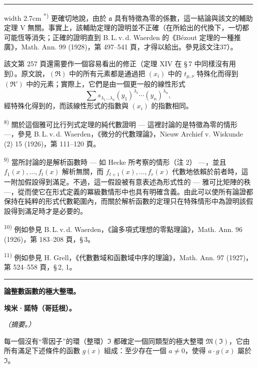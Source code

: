 \documentclass[11pt]{article}
\begin{document}
{\medskip
\hrule width 2.7cm
\smallskip
\noindent\textsuperscript{*)} 更確切地說，由於 $\mathfrak{a}$ 具有特徵為零的係數，這一結論與該文的輔助定理 V 無關。事實上，該輔助定理的證明並不正確（在所給出的代換下，一切都可能恆等消失；正確的證明直到 B.\,L.\,v.\,d. Waerden 的《Bézout 定理的一種推廣》，Math. Ann. 99 (1928)，第 497--541 頁，才得以給出。參見該文注37）。

該文第 257 頁還需要作一個容易看出的修正（定理 XIV 在 \S\,7 中同樣沒有用到）。原文說，$(\mathfrak{R})$ 中的所有元素都是通過把 $(x_i)$ 中的 $t_{\mu,\nu}$ 特殊化而得到 $(\mathfrak{R}')$ 中的元素；實際上，它們是由一個更一般的線性形式
\[
\sum s_{\lambda_1\ldots\lambda_n}(y_1)^{\lambda_1}\cdots(y_n)^{\lambda_n},
\]
經特殊化得到的，而該線性形式的指數與 $(x_i)$ 的指數相同。

\noindent\textsuperscript{8)} 關於這個雅可比行列式定理的純代數證明 --- 這裡討論的是特徵為零的情形 ---，參見 B.\,L.\,v.\,d. Waerden，《微分的代數理論》，Nieuw Archief v. Wiskunde (2) 15 (1926)，第 111--120 頁。

\noindent\textsuperscript{9)} 當所討論的是解析函數時 --- 如 Hecke 所考察的情形（注 2） ---，並且 $f_1(x),\ldots,f_t(x)$ 解析無關，而 $f_{t+1}(x),\ldots,f_r(x)$ 代數地依賴於前者時，這一附加假設得到滿足。不過，這一假設被有意表述為形式性的 --- 雅可比矩陣的秩 ---，從而使它在形式定義的冪級數情形中也具有明確含義。由此可以使所有論證都保持在純粹的形式代數範圍內，而關於解析函數的定理只在特殊情形中為證明該假設得到滿足時才是必要的。

\noindent\textsuperscript{10)} 例如參見 B.\,L.\,v.\,d. Waerden，《論多項式理想的零點理論》，Math. Ann. 96 (1926)，第 183--208 頁，\S\,3。

\noindent\textsuperscript{11)} 例如參見 H. Grell，《代數數域和函數域中序的理論》，Math. Ann. 97 (1927)，第 524--558 頁，\S\,2, 1。
}

\bigskip
\begin{center}\rule{4cm}{0.4pt}\end{center}
\begingroup
{}
\begin{center}
{\Large\bfseries 論整數函數的極大整環。}\par
\vspace{0.7em}
{\bfseries 埃米·諾特（哥廷根）。}\par
\vspace{0.5em}
\emph{（摘要。）}
\end{center}

每一個沒有“零因子”的環（整環）$\mathfrak{I}$ 都確定一個同類型的極大整環 $\mathfrak{M}(\mathfrak{I})$，它由所有滿足下述條件的函數 $g(x)$ 組成：至少存在一個 $a\ne0$，使得 $a\cdot g(x)$ 屬於 $\mathfrak{I}$。
\end{document}
